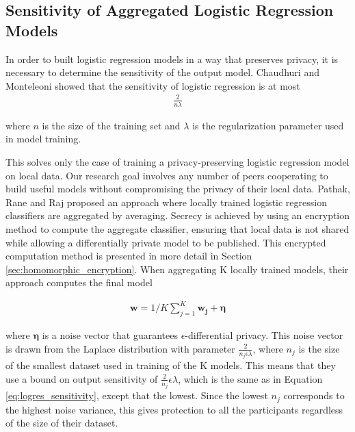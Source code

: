 \subsection{Sensitivity of Aggregated Logistic Regression Models}

In order to built logistic regression models in a way that preserves privacy, it is necessary to determine the sensitivity of the output model. Chaudhuri and Monteleoni\cite{chaudhuri2009logistic} showed that the sensitivity of logistic regression is at most 
\begin{eqnarray}\label{eq:logres_sensitivity}
	\frac{2}{n\lambda}
\end{eqnarray}

where $n$ is the size of the training set and $\lambda$ is the regularization parameter used in model training.

This solves only the case of training a privacy-preserving logistic regression model on local data. Our research goal involves any number of peers cooperating to build useful models without compromising the privacy of their local data.\unsure{} Pathak, Rane and Raj\cite{pathak2010diffprivhomo} proposed an approach where locally trained logistic regression classifiers are aggregated by averaging. Secrecy is achieved by using an encryption method to compute the aggregate classifier, ensuring that local data is not shared while allowing a differentially private model to be published. This encrypted computation method is presented in more detail in Section \ref{sec:homomorphic_encryption}. When aggregating K locally trained models, their approach computes the final model

\begin{eqnarray}
\boldsymbol{w} = 1/K\sum_{j=1}^{K} \boldsymbol{w_j} + \boldsymbol{\eta}
\end{eqnarray}

where $\boldsymbol{\eta}$ is a noise vector that guarantees $\epsilon$-differential privacy. This noise vector is drawn from the Laplace distribution with parameter $\frac{2}{n_j\epsilon\lambda}$, where $n_j$ is the size of the smallest dataset used in training of the K models. This means that they use a bound on output sensitivity of $\frac{2}{n_j}\epsilon\lambda$, which is the same as in Equation \ref{eq:logres_sensitivity}, except that the lowest. Since the lowest $n_j$ corresponds to the highest noise variance, this gives protection to all the participants regardless of the size of their dataset.
	


